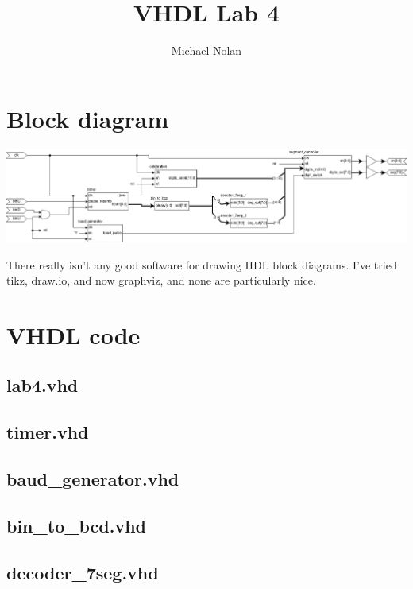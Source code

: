 \documentclass{article}
\title{VHDL Lab 4}
\author{Michael Nolan}
\begin{document}
\maketitle
\newpage

\section{Block diagram}

\includegraphics[width=\textwidth]{lab4_diagram}

There really isn't any good software for drawing HDL block diagrams. I've tried tikz, draw.io, and now graphviz, and none are particularly nice. 

\section{VHDL code}
\subsection{lab4.vhd}


\subsection{timer.vhd}


\subsection{baud\_generator.vhd}


\subsection{bin\_to\_bcd.vhd}


\subsection{decoder\_7seg.vhd}

\end{document}
